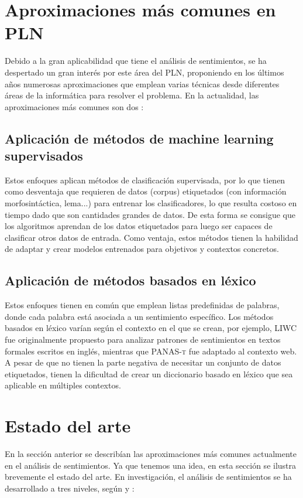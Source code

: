 \section{Aproximaciones más comunes en PLN} 
Debido a la gran aplicabilidad que tiene el análisis de sentimientos, se ha despertado un gran interés 
por este área del PLN, proponiendo en los últimos años numerosas aproximaciones que emplean varias técnicas desde diferentes áreas de la informática para resolver el problema. \newline
En la actualidad, las aproximaciones más comunes son dos \citet{ribeiro2016sentibench}: 
\subsection{Aplicación de métodos de machine learning supervisados}
Estos enfoques aplican métodos de clasificación supervisada, por lo que tienen como desventaja que requieren de datos (corpus) etiquetados (con información morfosintáctica, lema...) para entrenar los clasificadores, lo que resulta costoso en tiempo dado que son cantidades grandes de datos.\newline
De esta forma se consigue que los algoritmos aprendan de los datos etiquetados para luego ser capaces de clasificar otros datos de entrada. Como ventaja, estos métodos tienen la habilidad de adaptar y crear modelos entrenados para objetivos y contextos concretos.  
\subsection{Aplicación de métodos basados en léxico}
Estos enfoques tienen en común que emplean listas predefinidas de palabras, donde cada palabra está asociada a un sentimiento específico. Los métodos basados en léxico varían según el contexto en el que se crean, por ejemplo, \textsc{LIWC} \citet{tausczik2010psychological} fue originalmente propuesto para analizar patrones de sentimientos en textos formales escritos en inglés, mientras que \textsc{PANAS-t} \citet{gonccalves2013panas} fue adaptado al contexto web.\newline
A pesar de que no tienen la parte negativa de necesitar un conjunto de datos etiquetados, tienen la dificultad de crear un diccionario basado en léxico que sea aplicable en múltiples contextos. 
\section{Estado del arte}
En la sección anterior se describían las aproximaciones más comunes actualmente en el análisis de sentimientos. Ya que tenemos una idea, en esta sección se ilustra brevemente el estado del arte.\newline
En investigación, el análisis de sentimientos se ha desarrollado a tres niveles, según  \citet{9781107017894} y \citet{westerski2007sentiment} :
